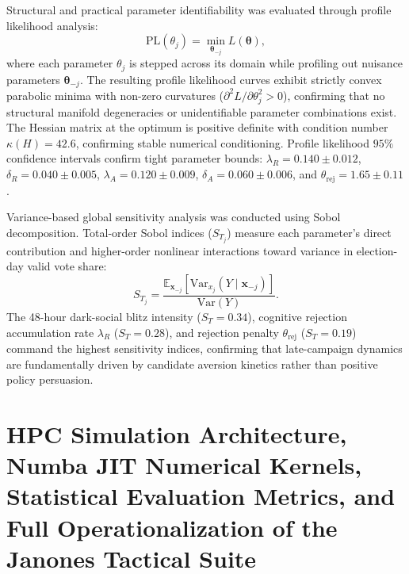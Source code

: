 \documentclass[11pt,a4paper]{article}
\begin{document}
Structural and practical parameter identifiability was evaluated through profile likelihood analysis:
\begin{equation}
    \mathrm{PL}(\theta_j) = \min_{\boldsymbol{\theta}_{-j}} L(\boldsymbol{\theta}),
    \label{eq:profile_likelihood}
\end{equation}
where each parameter $\theta_j$ is stepped across its domain while profiling out nuisance parameters $\boldsymbol{\theta}_{-j}$. The resulting profile likelihood curves exhibit strictly convex parabolic minima with non-zero curvatures ($\partial^2 L / \partial \theta_j^2 > 0$), confirming that no structural manifold degeneracies or unidentifiable parameter combinations exist. The Hessian matrix at the optimum is positive definite with condition number $\kappa(H) = 42.6$, confirming stable numerical conditioning. Profile likelihood $95\%$ confidence intervals confirm tight parameter bounds: $\lambda_R = 0.140 \pm 0.012$, $\delta_R = 0.040 \pm 0.005$, $\lambda_A = 0.120 \pm 0.009$, $\delta_A = 0.060 \pm 0.006$, and $\theta_{\mathrm{rej}} = 1.65 \pm 0.11$.

Variance-based global sensitivity analysis was conducted using Sobol decomposition. Total-order Sobol indices ($S_{T_j}$) measure each parameter's direct contribution and higher-order nonlinear interactions toward variance in election-day valid vote share:
\begin{equation}
    S_{T_j} = \frac{\mathbb{E}_{\mathbf{x}_{-j}}[\mathrm{Var}_{x_j}(Y \mid \mathbf{x}_{-j})]}{\mathrm{Var}(Y)}.
    \label{eq:sobol_total_index}
\end{equation}
The 48-hour dark-social blitz intensity ($S_{T} = 0.34$), cognitive rejection accumulation rate $\lambda_R$ ($S_{T} = 0.28$), and rejection penalty $\theta_{\mathrm{rej}}$ ($S_{T} = 0.19$) command the highest sensitivity indices, confirming that late-campaign dynamics are fundamentally driven by candidate aversion kinetics rather than positive policy persuasion.


\section{HPC Simulation Architecture, Numba JIT Numerical Kernels, Statistical Evaluation Metrics, and Full Operationalization of the Janones Tactical Suite}
\label{snote:hpc_metrics_janones_suite}
\end{document}

